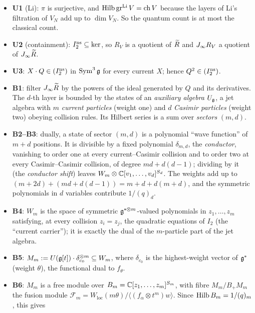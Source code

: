 \begin{itemize}
\item \textbf{U1} (Li): $\pi$ is surjective, and $\operatorname{Hilb}\operatorname{gr}^{\mathrm{Li}} V=\operatorname{ch} V$ because the layers of Li's
  filtration of $V_N$ add up to $\dim V_N$. So the quantum count is at most the classical count.
\item \textbf{U2} (containment): $I_2^{\mathrm{ns}}\subseteq\ker$, so $R_V$ is a quotient of $\widetilde R$ and $J_\infty R_V$ a
  quotient of $J_\infty\widetilde R$.
\item \textbf{U3}: $X\cdot Q\in(I_2^{\mathrm{ns}})$ in $\operatorname{Sym}^3\mathfrak g$ for every current $X$; hence $Q^2\in(I_2^{\mathrm{ns}})$.
\item \textbf{B1}: filter $J_\infty\widetilde R$ by the powers of the ideal generated by $Q$ and its derivatives. The $d$-th
  layer is bounded by the states of an \emph{auxiliary algebra} $U_{\mathfrak g}$, a jet algebra with $m$ \emph{current particles}
  (weight one) and $d$ \emph{Casimir particles} (weight two) obeying collision rules. Its Hilbert series is a sum over
  \emph{sectors} $(m,d)$.
\item \textbf{B2--B3}: dually, a state of sector $(m,d)$ is a polynomial ``wave function'' of $m+d$ positions. It is divisible
  by a fixed polynomial $\delta_{m,d}$, the \emph{conductor}, vanishing to order one at every current--Casimir collision and
  to order two at every Casimir--Casimir collision, of degree $md+d(d-1)$; dividing by it (the \emph{conductor shift}) leaves
  $W_m\otimes{\mathbb{C}}[v_1,\dots,v_d]^{S_d}$. The weights add up to $(m+2d)+(md+d(d-1))=m+d+d(m+d)$, and the symmetric
  polynomials in $d$ variables contribute $1/(q)_d$.
\item \textbf{B4}: $W_m$ is the space of symmetric $\mathfrak g^{*\otimes m}$-valued polynomials in
  $z_1,\dots,z_m$ satisfying, at every collision $z_i=z_j$, the quadratic equations of $I_2$ (the
  ``current carrier''); it is exactly the dual of the $m$-particle part of the jet algebra.
\item \textbf{B5}: $M_m:=U(\mathfrak g[t])\cdot\delta_{c_0}^{\otimes m}\subseteq W_m$, where $\delta_{c_0}$
  is the highest-weight vector of $\mathfrak g^*$ (weight $\theta$), the functional dual to $f_\theta$.
\item \textbf{B6}: $M_m$ is a free module over $B_m={\mathbb{C}}[z_1,\dots,z_m]^{S_m}$, with fibre $M_m/B_+M_m$ the fusion module
  $\mathcal F_m=W_{\mathrm{loc}}(m\theta)/\langle(f_\alpha\otimes t^m)w\rangle$. Since $\operatorname{Hilb} B_m=1/(q)_m$, this gives

\end{itemize}
